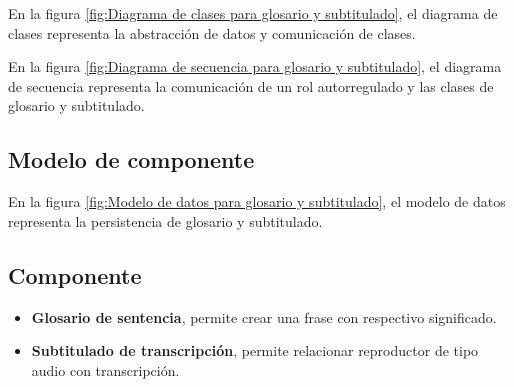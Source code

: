 En la figura \ref{fig:Diagrama de clases para glosario y subtitulado},
el diagrama de clases representa la abstracción de datos y comunicación
de clases.

\begin{minipage}{1.0\textwidth}
	\centering
	\label{fig:Diagrama de clases para glosario y subtitulado}
\end{minipage}

En la figura \ref{fig:Diagrama de secuencia para glosario y subtitulado},
el diagrama de secuencia representa la comunicación de un rol autorregulado
y las clases de glosario y subtitulado.

\begin{minipage}{1.0\textwidth}
	\centering
	\label{fig:Diagrama de secuencia para glosario y subtitulado}
\end{minipage}

\subsection{Modelo de componente}

En la figura \ref{fig:Modelo de datos para glosario y subtitulado}, el modelo
de datos representa la persistencia de glosario y subtitulado.

\begin{minipage}{1.0\textwidth}
	\centering
	\label{fig:Modelo de datos para glosario y subtitulado}
\end{minipage}

\subsection{Componente}

\begin{itemize}

\item \textbf{Glosario de sentencia}, permite crear una frase con respectivo
significado.
\item \textbf{Subtitulado de transcripción}, permite relacionar reproductor
de tipo audio con transcripción.

\end{itemize}


